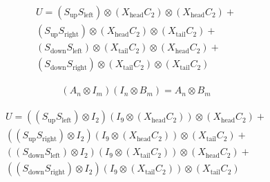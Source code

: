 \begin{align}
  U =
  (S_{\text{up}}  S_{\text{left}}) \otimes (X_{\text{head}}C_2) \otimes (X_{\text{head}}C_2) +   \\
  (S_{\text{up}}  S_{\text{right}}) \otimes (X_{\text{head}}C_2) \otimes (X_{\text{tail}}C_2) +  \\
  (S_{\text{down}}  S_{\text{left}}) \otimes (X_{\text{tail}}C_2) \otimes (X_{\text{head}}C_2) + \\
  (S_{\text{down}}  S_{\text{right}}) \otimes (X_{\text{tail}}C_2) \otimes (X_{\text{tail}}C_2)
\end{align}


\begin{align}
  (A_n \otimes I_m)(I_n \otimes B_m) = A_n \otimes B_m
\end{align}

\begin{align}
  U =
  ((S_{\text{up}}  S_{\text{left}}) \otimes I_2) (I_9 \otimes (X_{\text{head}}C_2)) \otimes (X_{\text{head}}C_2) +   \\
  ((S_{\text{up}}  S_{\text{right}}) \otimes I_2) (I_9 \otimes (X_{\text{head}}C_2)) \otimes (X_{\text{tail}}C_2) +  \\
  ((S_{\text{down}}  S_{\text{left}}) \otimes I_2) (I_9 \otimes (X_{\text{tail}}C_2)) \otimes (X_{\text{head}}C_2) + \\
  ((S_{\text{down}}  S_{\text{right}}) \otimes I_2) (I_9 \otimes (X_{\text{tail}}C_2)) \otimes (X_{\text{tail}}C_2)
\end{align}